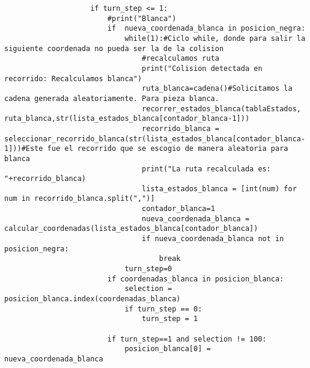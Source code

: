 \begin{lstlisting}
                    if turn_step <= 1:
                        #print("Blanca")
                        if  nueva_coordenada_blanca in posicion_negra:
                            while(1):#Ciclo while, donde para salir la siguiente coordenada no pueda ser la de la colision
                                #recalculamos ruta
                                print("Colision detectada en recorrido: Recalculamos blanca")
                                ruta_blanca=cadena()#Solicitamos la cadena generada aleatoriamente. Para pieza blanca.
                                recorrer_estados_blanca(tablaEstados, ruta_blanca,str(lista_estados_blanca[contador_blanca-1]))
                                recorrido_blanca = seleccionar_recorrido_blanca(str(lista_estados_blanca[contador_blanca-1]))#Este fue el recorrido que se escogio de manera aleatoria para blanca
                                print("La ruta recalculada es: "+recorrido_blanca)
                                lista_estados_blanca = [int(num) for num in recorrido_blanca.split(",")]
                                contador_blanca=1
                                nueva_coordenada_blanca = calcular_coordenadas(lista_estados_blanca[contador_blanca])
                                if nueva_coordenada_blanca not in posicion_negra:
                                    break
                            turn_step=0
                        if coordenadas_blanca in posicion_blanca:
                            selection = posicion_blanca.index(coordenadas_blanca)
                            if turn_step == 0:
                                turn_step = 1
                        
                        if turn_step==1 and selection != 100:
                            posicion_blanca[0] = nueva_coordenada_blanca
                            

\end{lstlisting}
